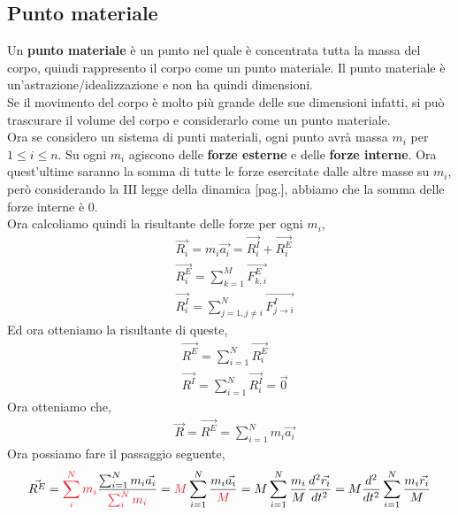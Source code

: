     \subsection{Punto materiale}
        Un \textbf{punto materiale} è un punto nel quale è concentrata tutta la massa del corpo, quindi rappresento il corpo come un punto materiale. Il punto materiale è un'astrazione/idealizzazione e non ha quindi dimensioni.\\
        Se il movimento del corpo è molto più grande delle sue dimensioni infatti, si può trascurare il volume del corpo e considerarlo come un punto materiale.\\
        Ora se considero un sistema di punti materiali, ogni punto avrà massa $m_i$ per $1\leq i\leq n$. Su ogni $m_i$ agiscono delle \textbf{forze esterne} e delle \textbf{forze interne}. Ora quest'ultime saranno la somma di tutte le forze esercitate dalle altre masse su $m_i$, però considerando la III legge della dinamica [pag.\pageref{IIILeggeDinamica}], abbiamo che la somma delle forze interne è $0$.\\
        Ora calcoliamo quindi la risultante delle forze per ogni $m_i$,
        \begin{align*}
            &\vec{R_i}=m_i\vec{a_i}=\vec{R_i^I} + \vec{R_i^E}\\
            &\vec{R_i^E}=\sum_{k=1}^M \vec{F_{k,i}^E}\\
            &\vec{R_i^I}=\sum_{j=1,j\neq i}^N \vec{F_{j\rightarrow i}^I}
        \end{align*}
        Ed ora otteniamo la risultante di queste,
        \begin{align*}
            &\vec{R^E}=\sum_{i=1}^N \vec{R_i^E}\\
            &\vec{R^I}=\sum_{i=1}^N \vec{R_i^I}=\vec{0}
        \end{align*}
        Ora otteniamo che,
        \begin{align*}
            &\vec{R}=\vec{R^E}=\sum_{i=1}^N m_i\vec{a_i}
        \end{align*}
        Ora possiamo fare il passaggio seguente,
        \begin{align*}
            \vec{R^E}=\textcolor{Red}{\sum_i^N m_i} \frac{\sum_{i=1}^N m_i\vec{a_i}}{\textcolor{Red}{\sum_i^N m_i}}=\textcolor{Red}{M} \sum_{i=1}^N \frac{m_i\vec{a_i}}{\textcolor{Red}{M}}=M \sum_{i=1}^N \frac{m_i}{M}\frac{d^2\vec{r_i}}{dt^2} = M \frac{d^2}{dt^2}\sum_{i=1}^N\frac{m_i\vec{r_i}}{M}
        \end{align*}
